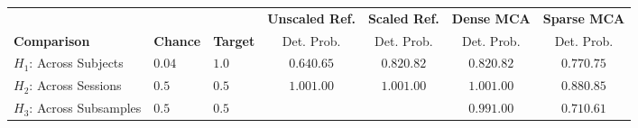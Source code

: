 
\begin{tabular}{lllcccc}
 \cellcolor{color1!10}          & \cellcolor{color1!10}   &  \cellcolor{color1!10} & \cellcolor{color1!10} \textbf{Unscaled Ref.} & \cellcolor{color1!10} \textbf{Scaled Ref.} & \cellcolor{color1!10}\textbf{Dense MCA} & \cellcolor{color1!10} \textbf{Sparse MCA} \\
\cellcolor{color1!10}\textbf{Comparison} & \cellcolor{color1!10}\textbf{Chance} & \cellcolor{color1!10}\textbf{Target} & \cellcolor{color1!10}Det. \quad Prob. & \cellcolor{color1!10}Det. \quad Prob. & \cellcolor{color1!10} Det. \quad Prob. & \cellcolor{color1!10}Det. \quad Prob. \\
\hline
$H_{1}$: Across Subjects  & $0.04$& $1.0$& $0.64$\quad$0.65$ &$0.82$\quad$0.82$& $0.82$\quad$0.82$& $0.77$\quad$0.75$\\
$H_{2}$: Across Sessions  & $0.5$ & $0.5$& $1.00$\quad$1.00$ &$1.00$\quad$1.00$& $1.00$\quad$1.00$& $0.88$\quad$0.85$\\
$H_{3}$: Across Subsamples& $0.5$ & $0.5$&                   &                 & $0.99$\quad$1.00$& $0.71$\quad$0.61$\\
\end{tabular}

